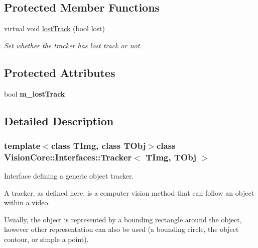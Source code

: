 \subsection*{Protected Member Functions}
\begin{DoxyCompactItemize}
\item 
\hypertarget{class_vision_core_1_1_interfaces_1_1_tracker_a0f12b4a4e0a1b6b997a763db3ebac72f}{}virtual void \hyperlink{class_vision_core_1_1_interfaces_1_1_tracker_a0f12b4a4e0a1b6b997a763db3ebac72f}{lost\+Track} (bool lost)\label{class_vision_core_1_1_interfaces_1_1_tracker_a0f12b4a4e0a1b6b997a763db3ebac72f}

\begin{DoxyCompactList}\small\item\em Set whether the tracker has lost track or not. \end{DoxyCompactList}\end{DoxyCompactItemize}
\subsection*{Protected Attributes}
\begin{DoxyCompactItemize}
\item 
\hypertarget{class_vision_core_1_1_interfaces_1_1_tracker_a00d04584106f8301ddf686b5e5f8f710}{}bool {\bfseries m\+\_\+lost\+Track}\label{class_vision_core_1_1_interfaces_1_1_tracker_a00d04584106f8301ddf686b5e5f8f710}

\end{DoxyCompactItemize}


\subsection{Detailed Description}
\subsubsection*{template$<$class T\+Img, class T\+Obj$>$class Vision\+Core\+::\+Interfaces\+::\+Tracker$<$ T\+Img, T\+Obj $>$}

Interface defining a generic object tracker. 

A tracker, as defined here, is a computer vision method that can follow an object within a video.

Usually, the object is represented by a bounding rectangle around the object, however other representation can also be used (a bounding circle, the object contour, or simple a point).

